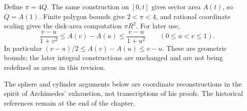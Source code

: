 Define $\pi=4Q$. The same construction on $[0,t]$ gives sector area $A(t)$,
so $Q=A(1)$. Finite polygon bounds give $2<\pi<4$, and rational coordinate
scaling gives the disk-area computation $\pi R^2$. For later use,
\[
 \frac{v-u}{1+v^2}\le A(v)-A(u)\le\frac{v-u}{1+u^2}
 \qquad(0\le u<v\le1).
\]
In particular $(v-u)/2\le A(v)-A(u)\le v-u$. These are geometric bounds;
the later integral constructions are unchanged and are not being redefined
as areas in this revision.

The sphere and cylinder arguments below are coordinate reconstructions in
the spirit of Archimedes' exhaustion, not transcriptions of his proofs.
The historical references remain at the end of the chapter.
